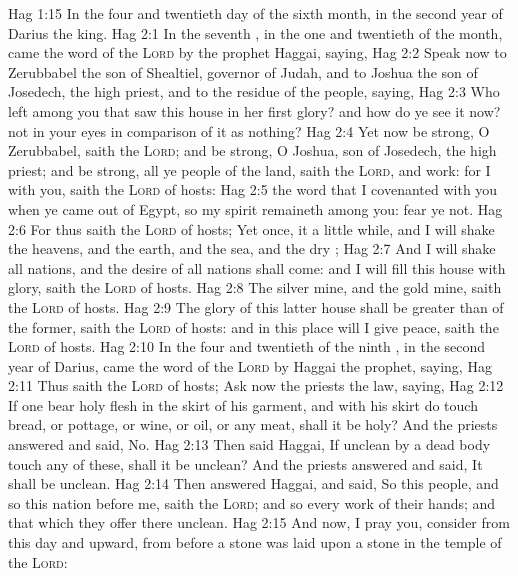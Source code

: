 \vs Hag 1:15 In the four and twentieth day of the sixth month, in the second year of Darius the king.
\vs Hag 2:1 In the seventh , in the one and twentieth  of the month, came the word of the \textsc{Lord} by the prophet Haggai, saying,
\vs Hag 2:2 Speak now to Zerubbabel the son of Shealtiel, governor of Judah, and to Joshua the son of Josedech, the high priest, and to the residue of the people, saying,
\vs Hag 2:3 Who  left among you that saw this house in her first glory? and how do ye see it now?  not in your eyes in comparison of it as nothing?
\vs Hag 2:4 Yet now be strong, O Zerubbabel, saith the \textsc{Lord}; and be strong, O Joshua, son of Josedech, the high priest; and be strong, all ye people of the land, saith the \textsc{Lord}, and work: for I  with you, saith the \textsc{Lord} of hosts:
\vs Hag 2:5  the word that I covenanted with you when ye came out of Egypt, so my spirit remaineth among you: fear ye not.
\vs Hag 2:6 For thus saith the \textsc{Lord} of hosts; Yet once, it  a little while, and I will shake the heavens, and the earth, and the sea, and the dry ;
\vs Hag 2:7 And I will shake all nations, and the desire of all nations shall come: and I will fill this house with glory, saith the \textsc{Lord} of hosts.
\vs Hag 2:8 The silver  mine, and the gold  mine, saith the \textsc{Lord} of hosts.
\vs Hag 2:9 The glory of this latter house shall be greater than of the former, saith the \textsc{Lord} of hosts: and in this place will I give peace, saith the \textsc{Lord} of hosts.
\vs Hag 2:10 In the four and twentieth  of the ninth , in the second year of Darius, came the word of the \textsc{Lord} by Haggai the prophet, saying,
\vs Hag 2:11 Thus saith the \textsc{Lord} of hosts; Ask now the priests  the law, saying,
\vs Hag 2:12 If one bear holy flesh in the skirt of his garment, and with his skirt do touch bread, or pottage, or wine, or oil, or any meat, shall it be holy? And the priests answered and said, No.
\vs Hag 2:13 Then said Haggai, If  unclean by a dead body touch any of these, shall it be unclean? And the priests answered and said, It shall be unclean.
\vs Hag 2:14 Then answered Haggai, and said, So  this people, and so  this nation before me, saith the \textsc{Lord}; and so  every work of their hands; and that which they offer there  unclean.
\vs Hag 2:15 And now, I pray you, consider from this day and upward, from before a stone was laid upon a stone in the temple of the \textsc{Lord}:

